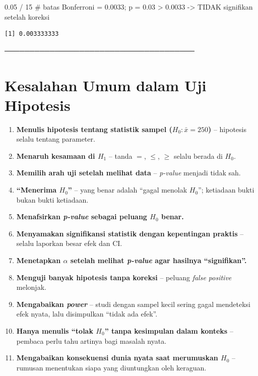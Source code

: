 \documentclass[
  indonesian,
  letterpaper,
]{book}
\newenvironment{Shaded}{\begin{snugshade}}{\end{snugshade}}
\newcommand{\CommentTok}[1]{\textcolor[rgb]{0.37,0.37,0.37}{#1}}
\newcommand{\DecValTok}[1]{\textcolor[rgb]{0.68,0.00,0.00}{#1}}
\newcommand{\FloatTok}[1]{\textcolor[rgb]{0.68,0.00,0.00}{#1}}
\newcommand{\SpecialCharTok}[1]{\textcolor[rgb]{0.37,0.37,0.37}{#1}}
\begin{document}
\begin{Shaded}
\begin{Highlighting}[]
\FloatTok{0.05} \SpecialCharTok{/} \DecValTok{15} \CommentTok{\# batas Bonferroni = 0.0033; p = 0.03 \textgreater{} 0.0033 {-}\textgreater{} TIDAK signifikan setelah koreksi}
\end{Highlighting}
\end{Shaded}

\begin{verbatim}
[1] 0.003333333
\end{verbatim}

──────────────────────────────────────

\section{Kesalahan Umum dalam Uji
Hipotesis}\label{kesalahan-umum-dalam-uji-hipotesis}

\begin{enumerate}
\def\labelenumi{\arabic{enumi}.}
\item
  \textbf{Menulis hipotesis tentang statistik sampel
  (\(H_0: \bar{x} = 250\))} -- hipotesis selalu tentang parameter.
\item
  \textbf{Menaruh kesamaan di \(H_1\)} -- tanda \(=\), \(\le\), \(\ge\)
  selalu berada di \(H_0\).
\item
  \textbf{Memilih arah uji setelah melihat data} -- \emph{p-value}
  menjadi tidak sah.
\item
  \textbf{``Menerima \(H_0\)''} -- yang benar adalah ``gagal menolak
  \(H_0\)''; ketiadaan bukti bukan bukti ketiadaan.
\item
  \textbf{Menafsirkan \emph{p-value} sebagai peluang \(H_0\) benar.}
\item
  \textbf{Menyamakan signifikansi statistik dengan kepentingan praktis}
  -- selalu laporkan besar efek dan CI.
\item
  \textbf{Menetapkan \(\alpha\) setelah melihat \emph{p-value} agar
  hasilnya ``signifikan''.}
\item
  \textbf{Menguji banyak hipotesis tanpa koreksi} -- peluang \emph{false
  positive} melonjak.
\item
  \textbf{Mengabaikan \emph{power}} -- studi dengan sampel kecil sering
  gagal mendeteksi efek nyata, lalu disimpulkan ``tidak ada efek''.
\item
  \textbf{Hanya menulis ``tolak \(H_0\)'' tanpa kesimpulan dalam
  konteks} -- pembaca perlu tahu artinya bagi masalah nyata.
\item
  \textbf{Mengabaikan konsekuensi dunia nyata saat merumuskan \(H_0\)}
  -- rumusan menentukan siapa yang diuntungkan oleh keraguan.
\end{enumerate}
\end{document}
